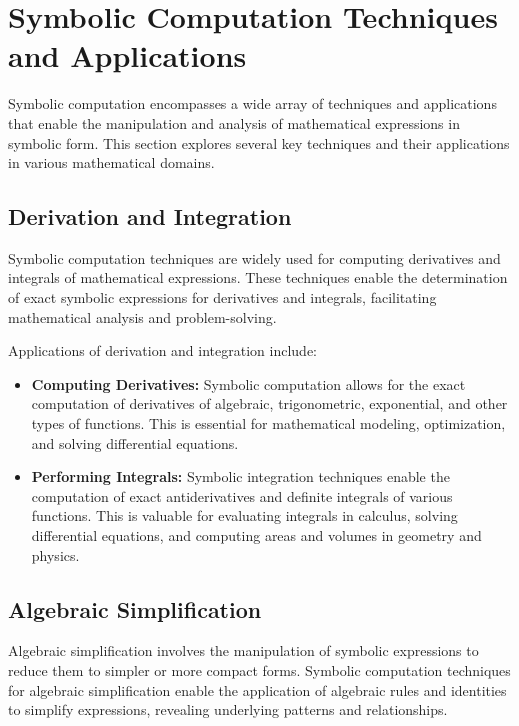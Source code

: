 
\section{Symbolic Computation Techniques and Applications}
\label{chap2:sec:techniques}

Symbolic computation encompasses a wide array of techniques and applications that enable the manipulation and analysis of mathematical expressions in symbolic form. This section explores several key techniques and their applications in various mathematical domains.

\subsection{Derivation and Integration}

Symbolic computation techniques are widely used for computing derivatives and integrals of mathematical expressions. These techniques enable the determination of exact symbolic expressions for derivatives and integrals, facilitating mathematical analysis and problem-solving.

Applications of derivation and integration include:
%
\begin{itemize}
  \setlength{\itemsep}{0.0em}
  \item \textbf{Computing Derivatives:} Symbolic computation allows for the exact computation of derivatives of algebraic, trigonometric, exponential, and other types of functions. This is essential for mathematical modeling, optimization, and solving differential equations.
  \item \textbf{Performing Integrals:} Symbolic integration techniques enable the computation of exact antiderivatives and definite integrals of various functions. This is valuable for evaluating integrals in calculus, solving differential equations, and computing areas and volumes in geometry and physics.
\end{itemize}

\subsection{Algebraic Simplification}

Algebraic simplification involves the manipulation of symbolic expressions to reduce them to simpler or more compact forms. Symbolic computation techniques for algebraic simplification enable the application of algebraic rules and identities to simplify expressions, revealing underlying patterns and relationships.

